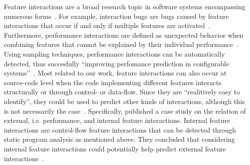 Feature interactions are a broad research topic in software systems encompassing numerous forms~\cite{apel2014feature}.
For example, interaction bugs are bugs caused by feature interactions that occur if and only if multiple features are activated~\cite{nie2011survey}.
Furthermore, performance interactions are defined as unexpected behavior when combining features that cannot be explained by their individual performance~\cite{siegmund2012predicting}.
Using sampling techniques, performance interactions can be automatically detected, thus succesfully ``improving perfomance prediction in configurable systems''~\cite{apel2014feature}.
Most related to our work, feature interactions can also occur at source-code level when the code implementing different features interacts structurally or through control- or data-flow.
Since they are ``realitively easy to identify''\cite{apel2014feature}, they could be used to predict other kinds of interactions, although this is not necessarily the case~\cite{apel2014feature}.
Specifically, \citet{kolesnikov2017relation} published a case study on the relation of external, i.e. performance, and internal feature interactions.  
Internal feature interactions are control-flow feature interactions that can be detected through static program analysis as mentioned above. 
They concluded that considering internal feature interactions could potentially help predict external feature interactions~\cite{kolesnikov2017relation}.  
